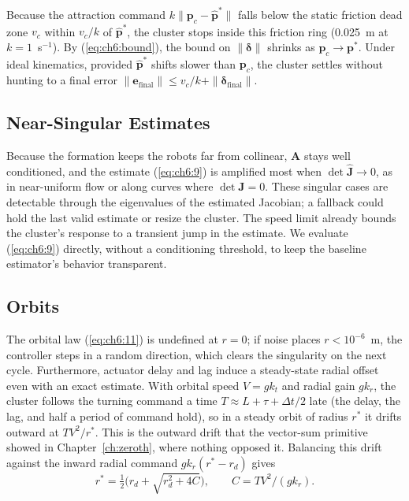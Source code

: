 Because the attraction command $k\|\mathbf{p}_c - \hat{\mathbf{p}}^*\|$ falls below the static friction dead zone $v_c$ within $v_c/k$ of $\hat{\mathbf{p}}^*$, the cluster stops inside this friction ring (0.025~m at $k = 1$~s$^{-1}$). By (\ref{eq:ch6:bound}), the bound on $\|\boldsymbol{\delta}\|$ shrinks as $\mathbf{p}_c \to \mathbf{p}^*$. Under ideal kinematics, provided $\hat{\mathbf{p}}^*$ shifts slower than $\mathbf{p}_c$, the cluster settles without hunting to a final error $\|\mathbf{e}_{\text{final}}\| \le v_c/k + \|\boldsymbol{\delta}_{\text{final}}\|$.

\subsection{Near-Singular Estimates}
\label{sec:ch6:near_singular}

Because the formation keeps the robots far from collinear, $\mathbf{A}$ stays well conditioned, and the estimate (\ref{eq:ch6:9}) is amplified most when $\det\hat{\mathbf{J}} \to 0$, as in near-uniform flow or along curves where $\det\mathbf{J} = 0$. These singular cases are detectable through the eigenvalues of the estimated Jacobian; a fallback could hold the last valid estimate or resize the cluster. The speed limit already bounds the cluster's response to a transient jump in the estimate. We evaluate (\ref{eq:ch6:9}) directly, without a conditioning threshold, to keep the baseline estimator's behavior transparent.

\subsection{Orbits}
\label{sec:ch6:orbits}

The orbital law (\ref{eq:ch6:11}) is undefined at $r = 0$; if noise places $r < 10^{-6}$~m, the controller steps in a random direction, which clears the singularity on the next cycle. Furthermore, actuator delay and lag induce a steady-state radial offset even with an exact estimate. With orbital speed $V = gk_t$ and radial gain $gk_r$, the cluster follows the turning command a time $T \approx L + \tau + \Delta t/2$ late (the delay, the lag, and half a period of command hold), so in a steady orbit of radius $r^*$ it drifts outward at $TV^2/r^*$. This is the outward drift that the vector-sum primitive showed in Chapter~\ref{ch:zeroth}, where nothing opposed it. Balancing this drift against the inward radial command $gk_r(r^* - r_d)$ gives
\begin{equation}\label{eq:ch6:orbit_cf}
r^* = \tfrac{1}{2}\bigl(r_d + \sqrt{r_d^2 + 4C}\bigr), \qquad C = TV^2/(gk_r).
\end{equation}

